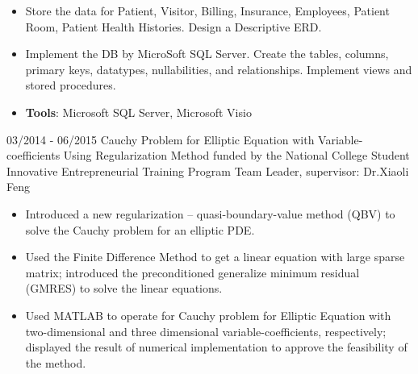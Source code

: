 \documentclass[letterpaper]{twentysecondcv} %
\begin{document}
\begin{twenty}
{{\begin{itemize}
				\item Store the data for Patient, Visitor, Billing, Insurance, Employees, Patient Room, Patient Health Histories. Design a Descriptive ERD.
				\item Implement the DB by MicroSoft SQL Server. Create the tables, columns, primary keys, datatypes, nullabilities, and relationships. Implement views and stored procedures.
				\item \textbf{Tools}: Microsoft SQL Server, Microsoft Visio\vspace{2mm}
		\end{itemize}}		
	}
	\twentyitem
	{03/2014}
	{- 06/2015}
	{Cauchy Problem for Elliptic Equation with Variable-coefficients Using Regularization Method}
	{funded by the National College Student Innovative Entrepreneurial Training Program}
	{Team Leader, supervisor: Dr.Xiaoli Feng}
	{
		{\begin{itemize}
				\item Introduced a new regularization -- quasi-boundary-value method (QBV) to solve the Cauchy problem for an elliptic PDE.
				\item Used the Finite Difference Method to get a linear equation with large sparse matrix; introduced the preconditioned generalize minimum residual (GMRES) to solve the linear equations.
				\item Used MATLAB to operate for Cauchy problem for Elliptic Equation with two-dimensional and three dimensional variable-coefficients, respectively; displayed the result of numerical implementation to approve the feasibility of the method. \vspace{2mm}
		\end{itemize}}
	}

\end{twenty}
\newpage
{}
\end{document}
